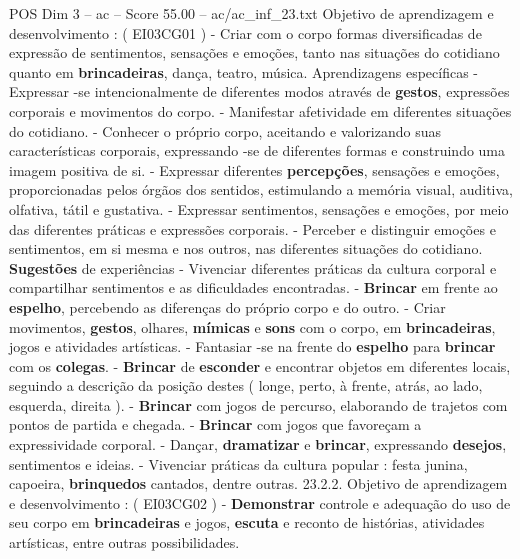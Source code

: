 \begin{textsample}{POS Dim 3 – ac – Score 55.00 – ac/ac\_inf\_23.txt}
Objetivo de aprendizagem e desenvolvimento : ( EI03CG01 ) - Criar com o corpo formas diversificadas de expressão de sentimentos, sensações e emoções, tanto nas situações do cotidiano quanto em \textbf{brincadeiras}, dança, teatro, música.
Aprendizagens específicas - Expressar -se intencionalmente de diferentes modos através de \textbf{gestos}, expressões corporais e movimentos do corpo. - Manifestar afetividade em diferentes situações do cotidiano. - Conhecer o próprio corpo, aceitando e valorizando suas características corporais, expressando -se de diferentes formas e construindo uma imagem positiva de si. - Expressar diferentes \textbf{percepções}, sensações e emoções, proporcionadas pelos órgãos dos sentidos, estimulando a memória visual, auditiva, olfativa, tátil e gustativa. - Expressar sentimentos, sensações e emoções, por meio das diferentes práticas e expressões corporais. - Perceber e distinguir emoções e sentimentos, em si mesma e nos outros, nas diferentes situações do cotidiano. \textbf{Sugestões} de experiências - Vivenciar diferentes práticas da cultura corporal e compartilhar sentimentos e as dificuldades encontradas. - \textbf{Brincar} em frente ao \textbf{espelho}, percebendo as diferenças do próprio corpo e do outro. - Criar movimentos, \textbf{gestos}, olhares, \textbf{mímicas} e \textbf{sons} com o corpo, em \textbf{brincadeiras}, jogos e atividades artísticas. - Fantasiar -se na frente do \textbf{espelho} para \textbf{brincar} com os \textbf{colegas}. - \textbf{Brincar} de \textbf{esconder} e encontrar objetos em diferentes locais, seguindo a descrição da posição destes ( longe, perto, à frente, atrás, ao lado, esquerda, direita ). - \textbf{Brincar} com jogos de percurso, elaborando de trajetos com pontos de partida e chegada. - \textbf{Brincar} com jogos que favoreçam a expressividade corporal. - Dançar, \textbf{dramatizar} e \textbf{brincar}, expressando \textbf{desejos}, sentimentos e ideias. - Vivenciar práticas da cultura popular : festa junina, capoeira, \textbf{brinquedos} cantados, dentre outras. 23.2.2.
Objetivo de aprendizagem e desenvolvimento : ( EI03CG02 ) - \textbf{Demonstrar} controle e adequação do uso de seu corpo em \textbf{brincadeiras} e jogos, \textbf{escuta} e reconto de histórias, atividades artísticas, entre outras possibilidades.

\end{textsample}
